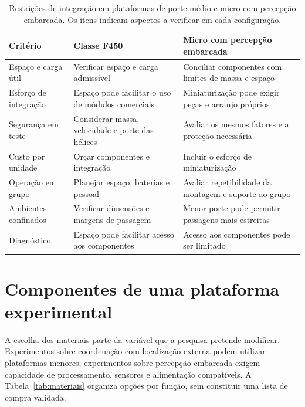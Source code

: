 \documentclass[11pt,a4paper,oneside]{book}
\numberwithin{equation}{chapter}
\begin{document}
\begin{table}[htbp]
\centering\small
\caption{Restrições de integração em plataformas de porte médio e micro com percepção embarcada. Os itens indicam aspectos a verificar em cada configuração.}
\label{tab:f450-micro}
\begin{tabularx}{\textwidth}{@{}>{\raggedright\arraybackslash}p{3cm}YY@{}}
\toprule
Critério & Classe F450 & Micro com percepção embarcada \\
\midrule
Espaço e carga útil & Verificar espaço e carga admissível & Conciliar componentes com limites de massa e espaço \\
Esforço de integração & Espaço pode facilitar o uso de módulos comerciais & Miniaturização pode exigir peças e arranjo próprios \\
Segurança em teste & Considerar massa, velocidade e porte das hélices & Avaliar os mesmos fatores e a proteção necessária \\
Custo por unidade & Orçar componentes e integração & Incluir o esforço de miniaturização \\
Operação em grupo & Planejar espaço, baterias e pessoal & Avaliar repetibilidade da montagem e suporte ao grupo \\
Ambientes confinados & Verificar dimensões e margens de passagem & Menor porte pode permitir passagens mais estreitas \\
Diagnóstico & Espaço pode facilitar acesso aos componentes & Acesso aos componentes pode ser limitado \\
\bottomrule
\end{tabularx}
\end{table}

\section{Componentes de uma plataforma experimental}
A escolha dos materiais parte da variável que a pesquisa pretende modificar. Experimentos sobre coordenação com localização externa podem utilizar plataformas menores; experimentos sobre percepção embarcada exigem capacidade de processamento, sensores e alimentação compatíveis. A Tabela~\ref{tab:materiais} organiza opções por função, sem constituir uma lista de compra validada.
\end{document}
